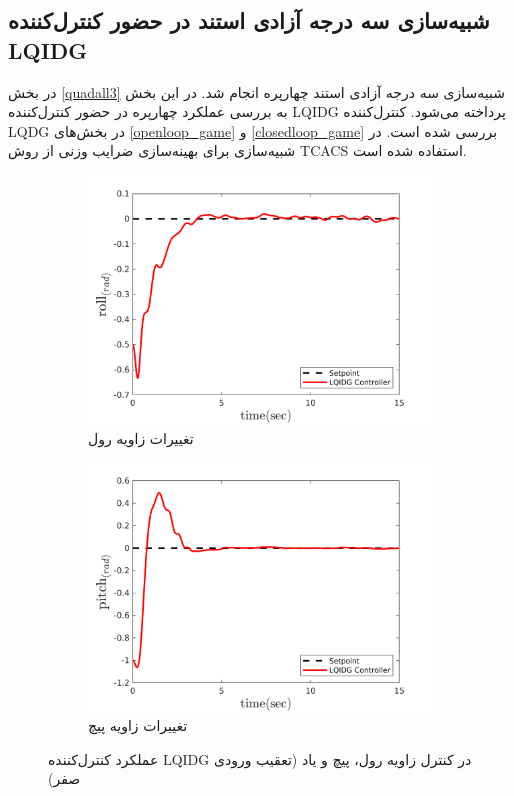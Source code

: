 \subsection{شبیه‌سازی سه درجه آزادی استند در حضور کنترل‌کننده LQIDG}\label{roll_pitch_yaw_lqidg_section}
در بخش
\ref{quadall3}
شبیه‌سازی سه درجه آزادی استند چهارپره انجام شد. در این بخش به بررسی عملکرد چهارپره در حضور کنترل‌کننده LQIDG پرداخته می‌شود. کنترل‌کننده LQDG در بخش‌های
\ref{openloop_game}
و
\ref{closedloop_game}
بررسی شده است.
 در شبیه‌سازی برای بهینه‌سازی ضرایب وزنی از روش
TCACS \cite{Karimi2010}
استفاده شده است.

\begin{figure}
	\centering
	\begin{subfigure}
		\centering
		\includegraphics[width=12cm]{../Figures/MIL/LQIDG/3DOF/lqidg_roll.png}
		\caption{تغییرات زاویه رول}
	\end{subfigure}%
	\begin{subfigure}
		\centering
		\includegraphics[width=12cm]{../Figures/MIL/LQIDG/3DOF/lqidg_pitch.png}
		\caption{تغییرات زاویه پیچ}
	\end{subfigure}
	\caption{‫‪عملکرد کنترل‌کننده LQIDG در کنترل زاویه رول، پیچ و یاد (تعقیب ورودی صفر)}
\end{figure}

